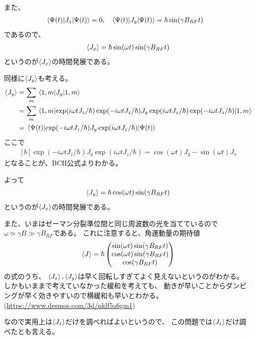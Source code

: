 \documentclass[../ap_2012.tex]{subfiles}
\begin{document}
また、
\begin{equation*}\begin{aligned}[b]
    \mel{\Psi(t)}{J_x}{\Psi(t)} &= 0, & \mel{\Psi(t)}{J_y}{\Psi(t)} &= \hbar\sin(\gamma B_{RF}t)
\end{aligned}\end{equation*}
であるので、
\begin{equation*}\begin{aligned}[b]
    \ev{J_x} = \hbar\sin(\omega t)\sin(\gamma B_{RF}t)
\end{aligned}\end{equation*}
というのが\(\ev{J_x}\)の時間発展である。

同様に\(\ev{J_y}\)も考える。
\begin{equation*}\begin{aligned}[b]
    \ev{J_y} &= \sum_m \mel{1,m}{J_y}{1,m}\\
    &=\sum_m \mel{1,m}{\exp(i\omega t J_z/\hbar)\exp(-i\omega t J_z/\hbar)J_y\exp(i\omega t J_z/\hbar)\exp(-i\omega t J_z/\hbar)}{1,m}\\
    &= \mel{\Psi(t)}{\exp(-i\omega t J_z/\hbar)J_y\exp(i\omega t J_z/\hbar)}{\Psi(t)}
\end{aligned}\end{equation*}
ここで
\begin{equation*}\begin{aligned}[b]
    \exp(-i\omega t J_z/\hbar)J_y\exp(i\omega t J_z/\hbar)
    = \cos(\omega t)J_y- \sin(\omega t)J_x
\end{aligned}\end{equation*}
となることが、BCH公式よりわかる。

よって
\begin{equation*}\begin{aligned}[b]
    \ev{J_y} = \hbar\cos(\omega t)\sin(\gamma B_{RF}t)
\end{aligned}\end{equation*}
というのが\(\ev{J_x}\)の時間発展である。

また、いまはゼーマン分裂準位間と同じ周波数の光を当てているので\(\omega \simeq \gamma B \gg \gamma B_{RF}\)である。
これに注意すると、角運動量の期待値
\begin{equation*}\begin{aligned}[b]
    \ev{J} = \hbar\begin{pmatrix}
        \sin(\omega t)\sin(\gamma B_{RF}t)\\
        \cos(\omega t)\sin(\gamma B_{RF}t)\\
        \cos(\gamma B_{RF}t)
    \end{pmatrix}
\end{aligned}\end{equation*}
の式のうち、
\(\ev{J_x},\ev{J_y}\)は早く回転しすぎてよく見えないというのがわかる。
しかもいままで考えていなかった緩和を考えても、
動きが早いことからダンピングが早く効きやすいので横緩和も早いとわかる。
(\url{https://www.desmos.com/3d/nklf5a6gm1})

なので実用上は\(\ev{J_z}\)だけを調べればよいというので、
この問題では\(\ev{J_z}\)だけ調べたとも言える。
\end{document}
